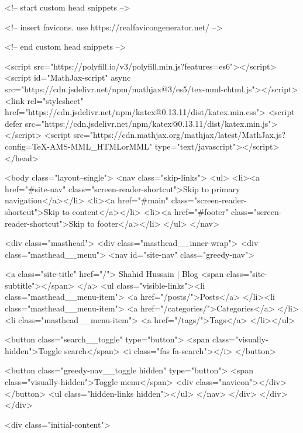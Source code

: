     <!-- start custom head snippets -->

<!-- insert favicons. use https://realfavicongenerator.net/ -->

<!-- end custom head snippets -->

    <script src="https://polyfill.io/v3/polyfill.min.js?features=es6"></script>
    <script id="MathJax-script" async src="https://cdn.jsdelivr.net/npm/mathjax@3/es5/tex-mml-chtml.js"></script>
    <link rel="stylesheet" href="https://cdn.jsdelivr.net/npm/katex@0.13.11/dist/katex.min.css">
    <script defer src="https://cdn.jsdelivr.net/npm/katex@0.13.11/dist/katex.min.js"></script>
    <script src="https://cdn.mathjax.org/mathjax/latest/MathJax.js?config=TeX-AMS-MML_HTMLorMML" type="text/javascript"></script>
  </head>

  <body class="layout--single">
    <nav class="skip-links">
  <ul>
    <li><a href="#site-nav" class="screen-reader-shortcut">Skip to primary navigation</a></li>
    <li><a href="#main" class="screen-reader-shortcut">Skip to content</a></li>
    <li><a href="#footer" class="screen-reader-shortcut">Skip to footer</a></li>
  </ul>
</nav>

    

<div class="masthead">
  <div class="masthead__inner-wrap">
    <div class="masthead__menu">
      <nav id="site-nav" class="greedy-nav">
        
        <a class="site-title" href="/">
          Shahid Hussain | Blog
          <span class="site-subtitle"></span>
        </a>
        <ul class="visible-links"><li class="masthead__menu-item">
              <a href="/posts/">Posts</a>
            </li><li class="masthead__menu-item">
              <a href="/categories/">Categories</a>
            </li><li class="masthead__menu-item">
              <a href="/tags/">Tags</a>
            </li></ul>
        
        <button class="search__toggle" type="button">
          <span class="visually-hidden">Toggle search</span>
          <i class="fas fa-search"></i>
        </button>
        
        <button class="greedy-nav__toggle hidden" type="button">
          <span class="visually-hidden">Toggle menu</span>
          <div class="navicon"></div>
        </button>
        <ul class="hidden-links hidden"></ul>
      </nav>
    </div>
  </div>
</div>


    <div class="initial-content">
      





